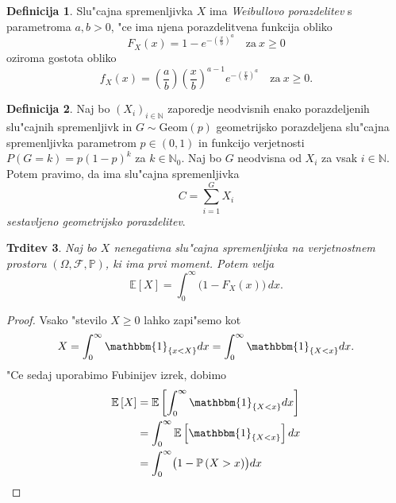 \documentclass[12pt, a4paper, reqno]{amsart}
\theoremstyle{definition}
\newtheorem{definicija}{Definicija}[section]
\theoremstyle{plain}
\newtheorem{trditev}[definicija]{Trditev}
\newcommand{\N}{\mathbb{N}}
\newcommand{\E}{\mathbb{E}}
\newcommand{\Prob}{\mathbb{P}}
\newcommand{\1}{\mathds{1}}
\begin{document}
    \begin{definicija}
        Slu"cajna spremenljivka $X$ ima \textit{Weibullovo porazdelitev} s parametroma $a, b > 0$, 
        "ce ima njena porazdelitvena funkcija obliko 
        \begin{equation*}
            F_X(x) = 1 - e^{-\left(\tfrac{x}{b}\right)^a} \quad \text{za} \ x\geq 0
        \end{equation*}
        oziroma gostota obliko
        \begin{equation*}
            f_X(x) = \left(\frac{a}{b}\right)\left(\frac{x}{b}\right)^{a-1}e^{-\left(\tfrac{x}{b}\right)^a} \quad \text{za} \ x\geq 0.
        \end{equation*}
        \label{def:WeibullovaPorazdelitev}
    \end{definicija}

    \begin{definicija}
        Naj bo $(X_i)_{i\in\N}$ zaporedje neodvisnih enako porazdeljenih slu"cajnih spremenljivk in 
        $G \sim \text{Geom}(p)$ geometrijsko porazdeljena slu"cajna spremenljivka  parametrom $p\in(0, 1)$ in 
        funkcijo verjetnosti $P(G = k) = p(1 - p)^{k}$ za $k\in\N_0$.
        Naj bo $G$ neodvisna od $X_i$ za vsak $i\in\N$. Potem pravimo, da ima slu"cajna spremenljivka
        \begin{equation*}
            C = \sum_{i= 1}^{G} X_i
        \end{equation*}
        \textit{sestavljeno geometrijsko porazdelitev}.
        \label{def:CompoundGeometricDistribution}
    \end{definicija}

    \begin{trditev}
        Naj bo $X$ nenegativna slu"cajna spremenljivka na verjetnostnem prostoru $(\Omega, \mathcal{F}, \Prob)$, 
        ki ima prvi moment. Potem velja 
        \begin{equation*}
            \E\left[X\right] = \int_0^\infty\bigl(1 - F_X(x)\bigr)\,dx.
        \end{equation*}
        \label{trd:PricakovanaVrednostZPrezivetveno}
    \end{trditev}

    \begin{proof}
        Vsako "stevilo $X\geq 0$ lahko zapi"semo kot 
        \begin{equation*}
            X = \int_0^\infty\mathbbm{1}_{\{x < X\}}dx = \int_0^\infty\mathbbm{1}_{\{X < x\}}dx.
        \end{equation*}
        "Ce sedaj uporabimo Fubinijev izrek, dobimo
        \begin{align*}
            \E\left[X\right] &= \E\left[\int_0^\infty\mathbbm{1}_{\{X < x\}}dx\right] \\
                             &= \int_0^\infty\E\left[\mathbbm{1}_{\{X < x\}}\right]dx \\
                             &= \int_0^\infty\bigl(1 - \Prob\left(X > x\right)\bigr)dx \\
        \end{align*}
    \end{proof}
\end{document}
